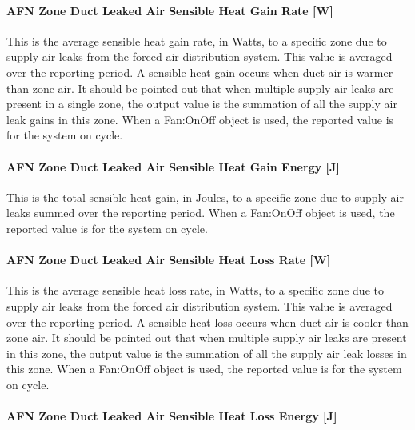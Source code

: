 \paragraph{AFN Zone Duct Leaked Air Sensible Heat Gain Rate {[}W{]}}\label{afn-zone-duct-leaked-air-sensible-heat-gain-rate-w}

This is the average sensible heat gain rate, in Watts, to a specific zone due to supply air leaks from the forced air distribution system. This value is averaged over the reporting period. A sensible heat gain occurs when duct air is warmer than zone air. It should be pointed out that when multiple supply air leaks are present in a single zone, the output value is the summation of all the supply air leak gains in this zone. When a Fan:OnOff object is used, the reported value is for the system on cycle.

\paragraph{AFN Zone Duct Leaked Air Sensible Heat Gain Energy {[}J{]}}\label{afn-zone-duct-leaked-air-sensible-heat-gain-energy-j}

This is the total sensible heat gain, in Joules, to a specific zone due to supply air leaks summed over the reporting period. When a Fan:OnOff object is used, the reported value is for the system on cycle.

\paragraph{AFN Zone Duct Leaked Air Sensible Heat Loss Rate {[}W{]}}\label{afn-zone-duct-leaked-air-sensible-heat-loss-rate-w}

This is the average sensible heat loss rate, in Watts, to a specific zone due to supply air leaks from the forced air distribution system. This value is averaged over the reporting period. A sensible heat loss occurs when duct air is cooler than zone air. It should be pointed out that when multiple supply air leaks are present in this zone, the output value is the summation of all the supply air leak losses in this zone. When a Fan:OnOff object is used, the reported value is for the system on cycle.

\paragraph{AFN Zone Duct Leaked Air Sensible Heat Loss Energy {[}J{]}}\label{afn-zone-duct-leaked-air-sensible-heat-loss-energy-j}


